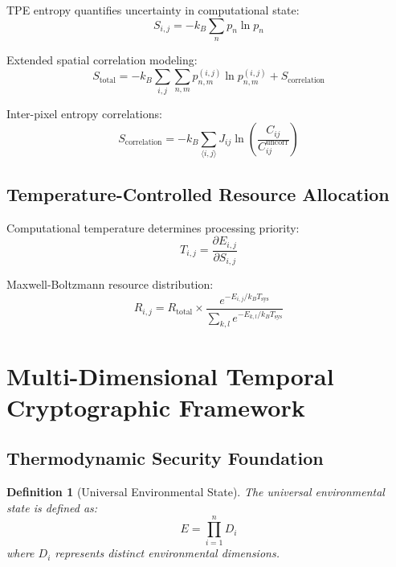 \documentclass[12pt,a4paper]{article}
\newtheorem{definition}[theorem]{Definition}
\begin{document}
TPE entropy quantifies uncertainty in computational state:
\begin{equation}
S_{i,j} = -k_B \sum_n p_n \ln p_n
\end{equation}

Extended spatial correlation modeling:
\begin{equation}
S_{\text{total}} = -k_B \sum_{i,j} \sum_{n,m} p_{n,m}^{(i,j)} \ln p_{n,m}^{(i,j)} + S_{\text{correlation}}
\end{equation}

Inter-pixel entropy correlations:
\begin{equation}
S_{\text{correlation}} = -k_B \sum_{\langle i,j \rangle} J_{ij} \ln\left(\frac{C_{ij}}{C_{ij}^{\text{uncorr}}}\right)
\end{equation}

\subsection{Temperature-Controlled Resource Allocation}

Computational temperature determines processing priority:
\begin{equation}
T_{i,j} = \frac{\partial E_{i,j}}{\partial S_{i,j}}
\end{equation}

Maxwell-Boltzmann resource distribution:
\begin{equation}
R_{i,j} = R_{\text{total}} \times \frac{e^{-E_{i,j}/k_B T_{\text{sys}}}}{\sum_{k,l} e^{-E_{k,l}/k_B T_{\text{sys}}}}
\end{equation}

\section{Multi-Dimensional Temporal Cryptographic Framework}

\subsection{Thermodynamic Security Foundation}

\begin{definition}[Universal Environmental State]
The universal environmental state is defined as:
\begin{equation}
E = \prod_{i=1}^n D_i
\end{equation}
where $D_i$ represents distinct environmental dimensions.
\end{definition}
\end{document}
